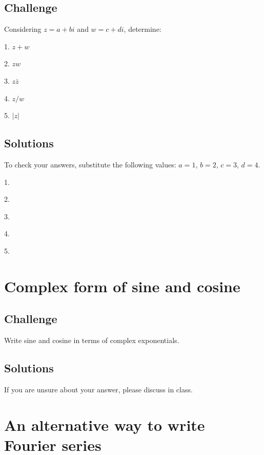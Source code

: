 \subsection*{Challenge}
Considering $z=a+bi$ and $w=c+di$, determine:

1. $z + w$

2. $zw$

3. $z \bar{z}$

4. $z/w$

5. $|z|$

\subsection*{Solutions}
To check your answers, substitute the following values: $a=1$, $b=2$, $c=3$, $d=4$.

1.\\

2.\\

3.\\

4.\\

5.\\




\newpage

\section{Complex form of sine and cosine}

\subsection*{Challenge}
Write sine and cosine in terms of complex exponentials.

\subsection*{Solutions}
If you are unsure about your answer, please discuss in class.




\newpage
\section{An alternative way to write Fourier series}
\label{sec:expfs}

